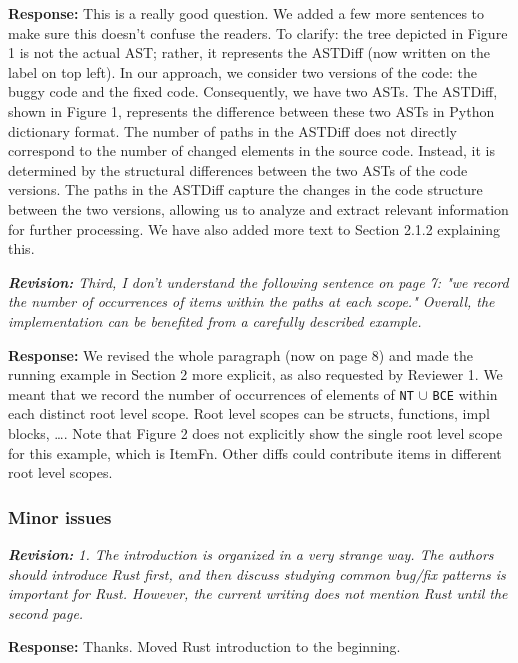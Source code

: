 \documentclass{article}
\begin{document}
\textbf{Response:} This is a really good question. We added a few more sentences to make sure this doesn't confuse the readers. To clarify: the tree depicted in Figure 1 is not the actual AST; rather, it represents the ASTDiff (now written on the label on top left). In our approach, we consider two versions of the code: the buggy code and the fixed code. Consequently, we have two ASTs. The ASTDiff, shown in Figure 1, represents the difference between these two ASTs in Python dictionary format. The number of paths in the ASTDiff does not directly correspond to the number of changed elements in the source code. Instead, it is determined by the structural differences between the two ASTs of the code versions. The paths in the ASTDiff capture the changes in the code structure between the two versions, allowing us to analyze and extract relevant information for further processing. We have also added more text to Section 2.1.2 explaining this.

\textit{\textbf{Revision:} Third, I don't understand the following sentence on page 7: "we record the number of occurrences of items within the paths at each scope." Overall, the implementation can be benefited from a carefully described example.}

\textbf{Response:} We revised the whole paragraph (now on page 8) and made the running example in Section 2 more explicit, as also requested by Reviewer 1. We meant that we record the number of occurrences of elements of \verb+NT+ $\cup$ \verb+BCE+ within each distinct root level scope. Root level scopes can be structs, functions, impl blocks, …. Note that Figure 2 does not explicitly show the single root level scope for this example, which is ItemFn. Other diffs could contribute items in different root level scopes. \\

\subsubsection{\label{rev:2:minor}Minor issues}

\textit{\textbf{Revision:} 1. The introduction is organized in a very strange way. The authors should introduce Rust first, and then discuss studying common bug/fix patterns is important for Rust. However, the current writing does not mention Rust until the second page.}

\textbf{Response:} Thanks. Moved Rust introduction to the beginning. \\ \\
\end{document}
